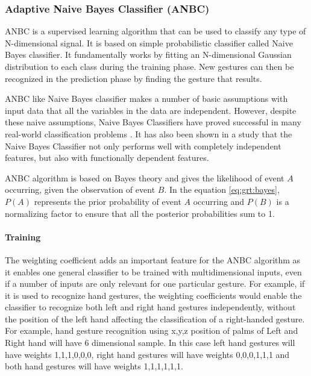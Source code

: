 \subsubsection{Adaptive Naive Bayes Classifier (ANBC)} \label{sec:anbc} ANBC \cite{14} is a supervised learning algorithm that can be used to classify any type of N-dimensional signal. It is based on simple probabilistic classifier called Naive Bayes classifier. It fundamentally works by fitting an N-dimensional Gaussian distribution to each class during the training phase. New gestures can then be recognized in the prediction phase by finding the gesture that results.

ANBC like Naive Bayes classifier makes a number of basic assumptions with input data that all the variables in the data are independent. However, despite these naive assumptions, Naive Bayes Classifiers have proved successful in many real-world classification problems \cite{15}. It has also been shown in a study that the Naive Bayes Classifier not only performs well with completely independent features, but also with functionally dependent features.

ANBC algorithm is based on Bayes theory and gives the likelihood of event $A$ occurring, given the observation of event $B$. In the equation \ref{eq:grt:bayes}, $P(A)$ represents the prior probability of event $A$ occurring and $P(B)$ is a normalizing factor to ensure that all the posterior probabilities sum to 1.



\paragraph*{Training} The weighting coefficient adds an important feature for the ANBC algorithm as it enables one general classifier to be trained with multidimensional inputs, even if a number of inputs are only relevant for one particular gesture. For example, if it is used to recognize hand gestures, the weighting coefficients would enable the classifier to recognize both left and right hand gestures independently, without the position of the left hand affecting the classification of a right-handed gesture. For example, hand gesture recognition using x,y,z position of palms of Left and Right hand will have 6 dimensional sample. In this case left hand gestures will have weights {1,1,1,0,0,0}, right hand gestures will have weights {0,0,0,1,1,1} and both hand gestures will have weights {1,1,1,1,1,1}.

